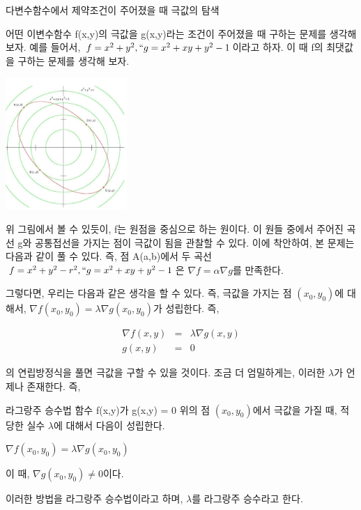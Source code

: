 \documentclass{beamer}
\begin{document}
\begin{frame}[allowframebreaks]{다변수함수에서 제약조건이 주어졌을 때 극값의 탐색} 


어떤 이변수함수 f(x,y)의 극값을 g(x,y)라는 조건이 주어졌을 때 구하는 문제를 생각해 보자. 예를 들어서, $f = x^2+y^2,`` g = x^2+xy+y^2-1$이라고 하자. 이 때 f의 최댓값을 구하는 문제를 생각해 보자.

\includegraphics[height=5cm,keepaspectratio]{lag}

 위 그림에서 볼 수 있듯이, f는 원점을 중심으로 하는 원이다. 이 원들 중에서 주어진 곡선 g와 공통접선을 가지는 점이 극값이 됨을 관찰할 수 있다. 이에 착안하여, 본 문제는 다음과 같이 풀 수 있다. 즉, 점 A(a,b)에서 두 곡선 $f=x^2+y^2-r^2, `` g = x^2+xy+y^2-1$은 $\nabla f = \alpha \nabla g$를 만족한다. 

그렇다면, 우리는 다음과 같은 생각을 할 수 있다. 즉, 극값을 가지는 점 $(x_0, y_0)$에 대해서, $\nabla f (x_0, y_0) = \lambda \nabla g(x_0, y_0)$가 성립한다. 즉, 

\begin{eqnarray} 
\nabla f(x,y) &=& \lambda \nabla g(x,y) \\
g(x,y) &=& 0
\end{eqnarray}

의 연립방정식을 풀면 극값을 구할 수 있을 것이다. 조금 더 엄밀하게는, 이러한 $\lambda$가 언제나 존재한다. 즉, 

\begin{block}{라그랑주 승수법} 
함수 f(x,y)가 g(x,y) = 0 위의 점 $(x_0, y_0)$에서 극값을 가질 때, 적당한 실수 $\lambda$에 대해서 다음이 성립한다. 

$\nabla f(x_0, y_0) = \lambda \nabla g(x_0, y_0)$ 

이 때, $\nabla g(x_0, y_0) \neq 0$이다. 
\end{block}
이러한 방법을 라그랑주 승수법이라고 하며, $\lambda$를 라그랑주 승수라고 한다. 

\end{frame}
\end{document}

